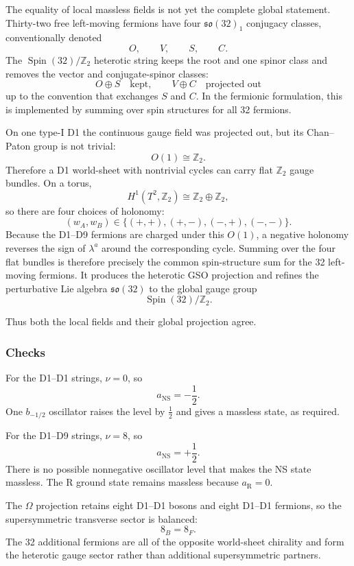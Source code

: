 \documentclass[
  10pt,
  a4paper,
  openany]{book}
\begin{document}
The equality of local massless fields is not yet the complete global
statement. Thirty-two free left-moving fermions have four
\(\mathfrak{so}(32)_1\) conjugacy classes, conventionally denoted \[
O,\qquad V,\qquad S,\qquad C.
\] The \(\operatorname{Spin}(32)/\mathbb Z_2\) heterotic string keeps
the root and one spinor class and removes the vector and
conjugate-spinor classes: \[
\boxed{
O\oplus S
\quad\text{kept},
\qquad
V\oplus C
\quad\text{projected out}
}
\] up to the convention that exchanges \(S\) and \(C\). In the fermionic
formulation, this is implemented by summing over spin structures for all
32 fermions.

On one type-I D1 the continuous gauge field was projected out, but its
Chan--Paton group is not trivial: \[
O(1)\cong\mathbb Z_2.
\] Therefore a D1 world-sheet with nontrivial cycles can carry flat
\(\mathbb Z_2\) gauge bundles. On a torus, \[
H^1(T^2,\mathbb Z_2)
\cong
\mathbb Z_2\oplus\mathbb Z_2,
\] so there are four choices of holonomy: \[
(w_A,w_B)
\in
\{(+,+),(+,-),(-,+),(-,-)\}.
\] Because the D1--D9 fermions are charged under this \(O(1)\), a
negative holonomy reverses the sign of \(\lambda^a\) around the
corresponding cycle. Summing over the four flat bundles is therefore
precisely the common spin-structure sum for the 32 left-moving fermions.
It produces the heterotic GSO projection and refines the perturbative
Lie algebra \(\mathfrak{so}(32)\) to the global gauge group \[
\boxed{
\operatorname{Spin}(32)/\mathbb Z_2
}.
\]

Thus both the local fields and their global projection agree.

\subsubsection{Checks}\label{checks-33}

For the D1--D1 strings, \(\nu=0\), so \[
a_{\mathrm{NS}}=-\frac12.
\] One \(b_{-1/2}\) oscillator raises the level by \(\frac12\) and gives
a massless state, as required.

For the D1--D9 strings, \(\nu=8\), so \[
a_{\mathrm{NS}}=+\frac12.
\] There is no possible nonnegative oscillator level that makes the NS
state massless. The R ground state remains massless because
\(a_{\mathrm R}=0\).

The \(\Omega\) projection retains eight D1--D1 bosons and eight D1--D1
fermions, so the supersymmetric transverse sector is balanced: \[
8_B=8_F.
\] The 32 additional fermions are all of the opposite world-sheet
chirality and form the heterotic gauge sector rather than additional
supersymmetric partners.
\end{document}
